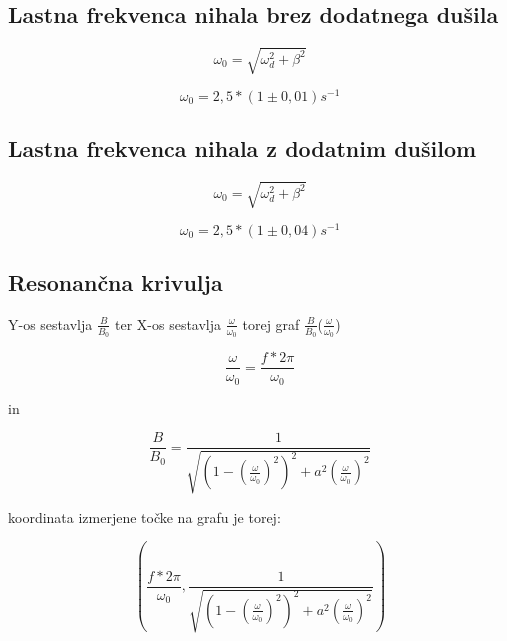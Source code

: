 \subsection{Lastna frekvenca nihala brez dodatnega dušila}
\centering \Large
\begin{equation}
    \omega_0 = \sqrt{\omega_d^2+\beta^2}
\end{equation}
\raggedright \normalsize
\centering \Large
\begin{equation}
    \omega_0 = 2,5 * (1\pm0,01) s^{-1}
\end{equation}
\raggedright \normalsize

\subsection{Lastna frekvenca nihala z dodatnim dušilom}
\centering \Large
\begin{equation}
    \omega_0 = \sqrt{\omega_d^2+\beta^2}
\end{equation}
\raggedright \normalsize
\centering \Large
\begin{equation}
    \omega_0 = 2,5 * (1\pm 0,04) s^{-1}
\end{equation}
\raggedright \normalsize

\subsection{Resonančna krivulja}

Y-os sestavlja $\frac{B}{B_0}$ ter X-os sestavlja $\frac{\omega}{\omega_0}$ torej graf $\frac{B}{B_0}$($\frac{\omega}{\omega_0}$)

\centering \Large
\begin{equation}
    \frac{\omega}{\omega_0} = \frac{f*2\pi}{\omega_0}
\end{equation}
\raggedright \normalsize

in

\centering \Large
\begin{equation}
    \frac{B}{B_0} = \frac{1}{\sqrt{(1-{(\frac{\omega}{\omega_0})}^2)^2+a^2({\frac{\omega}{\omega_0}})^2}}
\end{equation}
\raggedright \normalsize

koordinata izmerjene točke na grafu je torej:

\centering \Large
\begin{equation}
    (\frac{f*2\pi}{\omega_0} , \frac{1}{\sqrt{(1-{(\frac{\omega}{\omega_0})}^2)^2+a^2({\frac{\omega}{\omega_0}})^2}})
\end{equation}
\raggedright \normalsize

